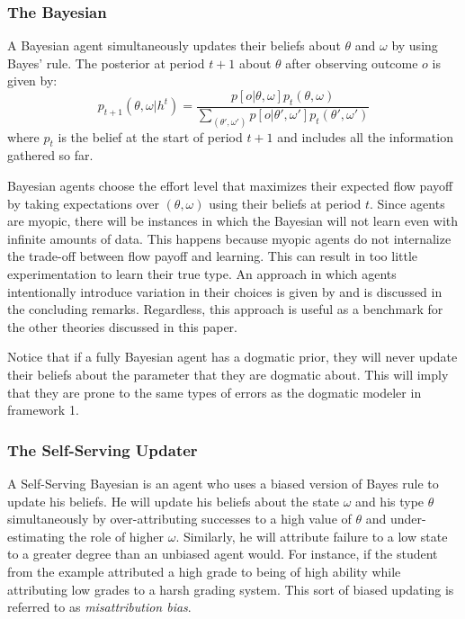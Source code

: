 \documentclass[
  12pt,
]{article}
\begin{document}
\hypertarget{the-bayesian}{%
\subsubsection{The Bayesian}\label{the-bayesian}}

A Bayesian agent simultaneously updates their beliefs about \(\theta\)
and \(\omega\) by using Bayes' rule. The posterior at period \(t+1\)
about \(\theta\) after observing outcome \(o\) is given by: \[
p_{t+1}(\theta, \omega| h^t) = \frac{p[o|\theta, \omega]p_t(\theta, \omega)}{\sum_{(\theta', \omega')}p[o|\theta', \omega']p_t(\theta', \omega')}
\] where \(p_{t}\) is the belief at the start of period \(t+1\) and
includes all the information gathered so far.

Bayesian agents choose the effort level that maximizes their expected
flow payoff by taking expectations over \((\theta, \omega)\) using their
beliefs at period \(t\). Since agents are myopic, there will be
instances in which the Bayesian will not learn even with infinite
amounts of data. This happens because myopic agents do not internalize
the trade-off between flow payoff and learning. This can result in too
little experimentation to learn their true type. An approach in which
agents intentionally introduce variation in their choices is given by
\citet{Hestermann2021} and is discussed in the concluding remarks.
Regardless, this approach is useful as a benchmark for the other
theories discussed in this paper.

Notice that if a fully Bayesian agent has a dogmatic prior, they will
never update their beliefs about the parameter that they are dogmatic
about. This will imply that they are prone to the same types of errors
as the dogmatic modeler in framework 1.

\hypertarget{the-self-serving-updater}{%
\subsubsection{The Self-Serving
Updater}\label{the-self-serving-updater}}

A Self-Serving Bayesian is an agent who uses a biased version of Bayes
rule to update his beliefs. He will update his beliefs about the state
\(\omega\) and his type \(\theta\) simultaneously by over-attributing
successes to a high value of \(\theta\) and under-estimating the role of
higher \(\omega\). Similarly, he will attribute failure to a low state
to a greater degree than an unbiased agent would. For instance, if the
student from the example attributed a high grade to being of high
ability while attributing low grades to a harsh grading system. This
sort of biased updating is referred to as \emph{misattribution bias}.
\end{document}
